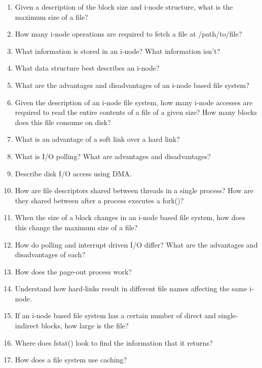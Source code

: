\documentclass[11pt]{article}
\begin{document}
\begin{enumerate}
\item Given a description of the block size and i-node structure, what is the maximum size of a file?
\item How many i-node operations are required to fetch a file at /path/to/file?
\item What information is stored in an i-node? What information isn’t?
\item What data structure best describes an i-node?
\item What are the advantages and disadvantages of an i-node based file system?
\item Given the description of an i-node file system, how many i-node
   accesses are required to read the entire contents of a file of a
   given size? How many blocks does this file consume on disk?
\item What is an advantage of a soft link over a hard link?
\item What is I/O polling? What are advantages and disadvantages?
\item Describe disk I/O access using DMA.
\item How are file descriptors shared between threads in a single
    process? How are they shared between after a process executes a fork()?
\item When the size of a block changes in an i-node based file system,
    how does this change the maximum size of a file?
\item How do polling and interrupt driven I/O differ? What are the
    advantages and disadvantages of each?
\item How does the page-out process work?
\item Understand how hard-links result in different file names affecting
    the same i-node.
\item If an i-node based file system has a certain number of direct and
    single-indirect blocks, how large is the file?
\item Where does fstat() look to find the information that it returns?
\item How does a file system use caching?
\end{enumerate}
\end{document}

